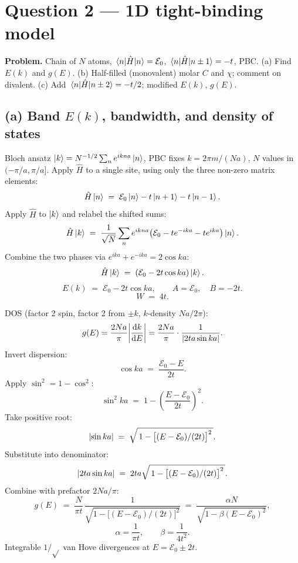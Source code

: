 \documentclass[11pt]{article}
\newcommand{\de}{\mathrm{d}}
\begin{document}
\section*{Question 2 --- 1D tight-binding model}

\textbf{Problem.} Chain of $N$ atoms, $\matrixel{n}{\hat H}{n}=\mathcal{E}_0$, $\matrixel{n}{\hat H}{n\pm 1}=-t$, PBC. (a) Find $E(k)$ and $g(E)$. (b) Half-filled (monovalent) molar $C$ and $\chi$; comment on divalent. (c) Add $\matrixel{n}{\hat H}{n\pm 2}=-t/2$; modified $E(k)$, $g(E)$.

\subsection*{(a) Band $E(k)$, bandwidth, and density of states}

Bloch ansatz $\ket k=N^{-1/2}\sum_n e^{ikna}\ket n$, PBC fixes $k=2\pi m/(Na)$, $N$ values in $(-\pi/a,\pi/a]$. Apply $\hat H$ to a single site, using only the three non-zero matrix elements:
\[
\hat H\ket n \;=\; \mathcal{E}_0\ket n - t\ket{n+1} - t\ket{n-1}.
\]
Apply $\hat H$ to $\ket k$ and relabel the shifted sums:
\[
\hat H\ket k \;=\; \frac{1}{\sqrt N}\sum_n e^{ikna}\bigl(\mathcal{E}_0 - t e^{-ika} - t e^{ika}\bigr)\ket n.
\]
Combine the two phases via $e^{ika}+e^{-ika}=2\cos ka$:
\[
\hat H\ket k \;=\; (\mathcal{E}_0 - 2t\cos ka)\ket k.
\]
\begin{equation}
\boxed{\;E(k) \;=\; \mathcal{E}_0 - 2t \cos ka, \qquad A = \mathcal{E}_0,\quad B = -2t.\;}
\label{eq:Ek}
\end{equation}
\begin{equation}
\boxed{\;W \;=\; 4t.\;}
\label{eq:bandwidth}
\end{equation}

DOS (factor 2 spin, factor 2 from $\pm k$, $k$-density $Na/2\pi$):
\[
g(E)=\frac{2Na}{\pi}\abs{\frac{\de k}{\de E}}=\frac{2Na}{\pi}\cdot\frac{1}{\abs{2ta\sin ka}}.
\]
Invert dispersion:
\[
\cos ka \;=\; \frac{\mathcal{E}_0 - E}{2t}.
\]
Apply $\sin^2 = 1 - \cos^2$:
\[
\sin^2 ka \;=\; 1 - \left(\frac{E-\mathcal{E}_0}{2t}\right)^{2}.
\]
Take positive root:
\[
\abs{\sin ka} \;=\; \sqrt{\,1 - \bigl[(E-\mathcal{E}_0)/(2t)\bigr]^{2}\,}.
\]
Substitute into denominator:
\[
\abs{2ta\sin ka} \;=\; 2ta\sqrt{\,1 - \bigl[(E-\mathcal{E}_0)/(2t)\bigr]^{2}\,}.
\]
Combine with prefactor $2Na/\pi$:
\begin{equation}
g(E) \;=\; \frac{N}{\pi t}\,\frac{1}{\sqrt{1-\bigl[(E-\mathcal{E}_0)/(2t)\bigr]^{2}}} \;=\; \frac{\alpha N}{\sqrt{1 - \beta(E-\mathcal{E}_0)^{2}}},
\label{eq:gE2}
\end{equation}
\begin{equation}
\boxed{\;\alpha = \frac{1}{\pi t},\qquad \beta = \frac{1}{4 t^{2}}.\;}
\label{eq:abox2}
\end{equation}
Integrable $1/\sqrt{}$ van Hove divergences at $E=\mathcal E_0\pm 2t$.
\end{document}

